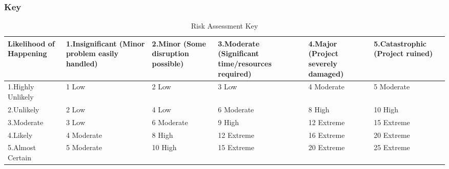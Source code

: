 \documentclass[12pt]{article}
\begin{document}
			\subsubsection{Key}
				\begin{table}[!htb]
					\begin{center}
						\caption{Risk Assessment Key}
						\label{table:riskassessmentkey}
						\setlength{\aboverulesep}{0pt}
						\setlength{\belowrulesep}{0pt}
						\setlength{\extrarowheight}{.75ex}
						\begin{tabular}{|*{6}{p{2cm}|}}
							\toprule
							Likelihood of Happening & \cellcolor{greenI}1.Insignificant {\scriptsize (Minor problem easily handled)} & \cellcolor{greenII}2.Minor {\scriptsize (Some disruption possible)} & \cellcolor{yellowI}3.Moderate {\scriptsize (Significant time/resources required)} & \cellcolor{orangeI}4.Major {\scriptsize (Project severely damaged)} & \cellcolor{redI}5.Catastrophic {\scriptsize (Project ruined)}\\
							\midrule
							
							\cellcolor{greenI}1.Highly Unlikely & \cellcolor{greenIII}1 Low & \cellcolor{greenIII}2 Low & \cellcolor{greenIII}3 Low & \cellcolor{yellowII}4 Moderate & \cellcolor{yellowII}5 Moderate\\
							\midrule
							
							\cellcolor{greenII} 2.Unlikely & \cellcolor{greenIII}2 Low & \cellcolor{yellowII}4 Low & \cellcolor{yellowII}6 Moderate & \cellcolor{orangeII} 8 High & \cellcolor{orangeII}10 High\\
							\midrule
							
							\cellcolor{yellowI}3.Moderate & \cellcolor{greenIII}3 Low & \cellcolor{yellowII}6 Moderate & \cellcolor{orangeII}9 High & \cellcolor{redII}12 Extreme & \cellcolor{redII}15 Extreme\\
							\midrule
							
							\cellcolor{orangeI}4.Likely & \cellcolor{yellowII}4 Moderate & \cellcolor{orangeII}8 High & \cellcolor{redII}12 Extreme & \cellcolor{redII}16 Extreme & \cellcolor{redII}20 Extreme\\
							\midrule
							
							\cellcolor{redI}5.Almost Certain & \cellcolor{yellowII}5 Moderate & \cellcolor{orangeII}10 High & \cellcolor{redII}15 Extreme & \cellcolor{redII}20 Extreme & \cellcolor{redII}25 Extreme\\
							\bottomrule
						\end{tabular}
					\end{center}
				\end{table}
			    	
\end{document}
